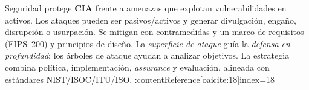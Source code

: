 \documentclass[11pt,a4paper]{article}
\begin{document}
    \begin{ResumenBox}
        Seguridad protege \textbf{CIA} frente a amenazas que explotan vulnerabilidades en activos.
        Los ataques pueden ser pasivos/activos y generar divulgación, engaño, disrupción o usurpación.
        Se mitigan con contramedidas y un marco de requisitos (FIPS~200) y principios de diseño.
        La \textit{superficie de ataque} guía la \textit{defensa en profundidad}; los árboles de ataque ayudan a analizar objetivos.
        La estrategia combina política, implementación, \textit{assurance} y evaluación, alineada con estándares NIST/ISOC/ITU/ISO. :contentReference[oaicite:18]{index=18}
    \end{ResumenBox}
\end{document}
